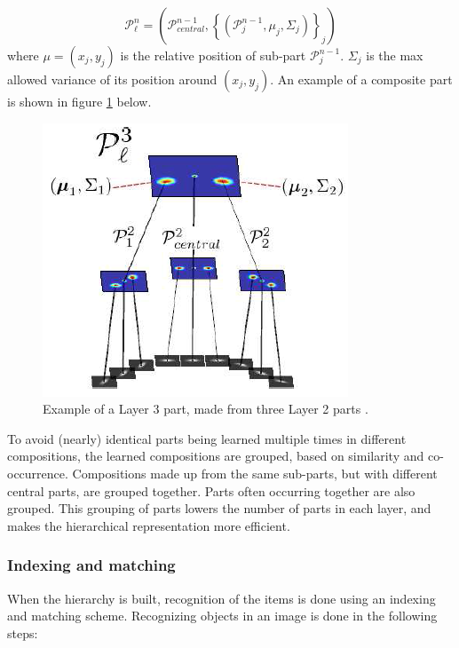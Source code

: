 \begin{equation}
\mathcal{P}_{\ell}^n = \left(\mathcal{P}_{central}^{n-1} , \left\{\left(\mathcal{P}_j^{n-1}, \mu_j, \Sigma_j \right) \right\}_j \right)
\label{eqn:composition_of_parts}
\end{equation}
where $\mu = (x_j, y_j)$ is the relative position of sub-part $\mathcal{P}_{j}^{n-1}$. 
$\Sigma_j$ is the max allowed variance of its position around $(x_j, y_j)$.
An example of a composite part is shown in figure \ref{fig:compositionality2} below.

\begin{figure}[h!] %
\centering
\includegraphics[scale=0.6]{graphics/compositionality2}
\caption[Example of a Layer 3 part]{Example of a Layer 3 part, made from three Layer 2 parts \citep[fig.~2]{fidler2009learning}.}
\label{fig:compositionality2}
\end{figure}

To avoid (nearly) identical parts being learned multiple times in different compositions,
the learned compositions are grouped, based on similarity and co-occurrence. 
Compositions made up from the same sub-parts, but with different central parts,
are grouped together. Parts often occurring together are also grouped.
This grouping of parts lowers the number of parts in each layer,
and makes the hierarchical representation more efficient.

\subsubsection{Indexing and matching}
\label{sec:indexing-matching}
When the hierarchy is built,
recognition of the items is done using an indexing and matching scheme.
Recognizing objects in an image is done in the following steps: 

